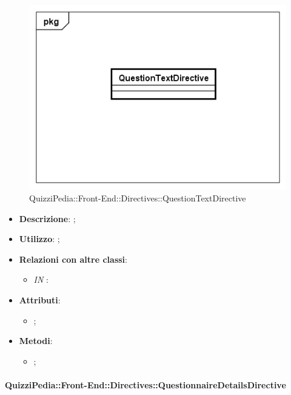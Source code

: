 \begin{figure}[h]
	\centering
	\includegraphics[scale=0.5,keepaspectratio]{UML/Classi/Front-End/QuizziPedia_Front-end_Directives_QuestionTextDirective.png}
	\caption{QuizziPedia::Front-End::Directives::QuestionTextDirective}
\end{figure}

\begin{itemize}
	\item \textbf{Descrizione}: ;
	\item \textbf{Utilizzo}: ;
	\item \textbf{Relazioni con altre classi}: 
	\begin{itemize}
		\item \textit{IN} \texttt{}: 
	\end{itemize}
	\item \textbf{Attributi}: 
	\begin{itemize}
		\item ;
	\end{itemize}
	\item \textbf{Metodi}: 
	\begin{itemize}
		\item ;
	\end{itemize}
\end{itemize}

\paragraph{QuizziPedia::Front-End::Directives::QuestionnaireDetailsDirective}

\label{QuizziPedia::Front-End::Directives::QuestionnaireDetailsDirective}

